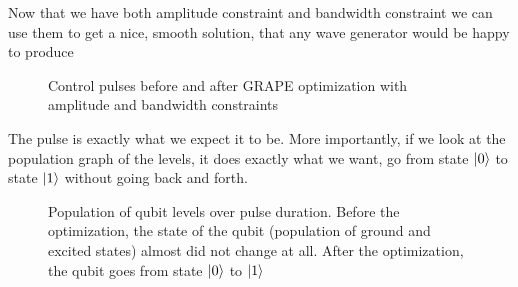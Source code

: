 
Now that we have both amplitude constraint and bandwidth constraint we can use them to get a nice, smooth solution, that any wave generator would be happy to produce
\begin{figure}[H]
 \begin{center}
        
    \end{center}
    \caption{Control pulses before and after GRAPE optimization with amplitude and bandwidth constraints}
    \label{fig:band-amp-const-qubit}
\end{figure}
The pulse is exactly what we expect it to be. More importantly, if we look at the population graph of the levels, it does exactly what we want, go from state $\ket{0}$ to state $\ket{1}$ without going back and forth.
\begin{figure}[H]
    \begin{center}
        
    \end{center}
    \caption{Population of qubit levels over pulse duration. Before the optimization, the state of the qubit (population of ground and excited states) almost did not change at all. After the optimization, the qubit goes from state $\ket{0}$ to $\ket{1}$}
    \label{fig:band-amp-const-level-population}
\end{figure}

